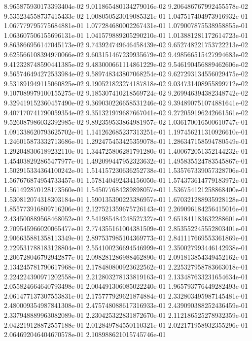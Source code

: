 8.965875930173393404e-02
9.011865480134279016e-02
9.206486767992455578e-02
9.535234558737415433e-02
1.008050523019085321e-01
1.047517404973916932e-01
1.067779795775684881e-01
1.077284680002267431e-01
1.079007875538958855e-01
1.063607506155696131e-01
1.041579889205290210e-01
1.013881281172614723e-01
9.863866956147045173e-02
9.743924749646458439e-02
9.652748221753722213e-02
9.625566108394970066e-02
9.603151467239935679e-02
9.498566515427994683e-02
9.412328748590441385e-02
9.483000661114861229e-02
9.546190456889462606e-02
9.565746494272533984e-02
9.589748343807068254e-02
9.627293134556029475e-02
9.531891949115060825e-02
9.190521823274187818e-02
9.034731408955899712e-02
9.107089979100155275e-02
9.185307410218569724e-02
9.269946394382348742e-02
9.329419152360457490e-02
9.369030226658531246e-02
9.394890751074881641e-02
9.407170741790059354e-02
9.351321979687667041e-02
9.272059196242661561e-02
9.526087986032392985e-02
9.892359533864981957e-02
1.036170016500610747e-01
1.091338620793625702e-01
1.141262685237313251e-01
1.197456211310926610e-01
1.246015873332713686e-01
1.292475453425359078e-01
1.286347158594780549e-01
1.292048306189232110e-01
1.344725806281791280e-01
1.400672051352144232e-01
1.454038292865477977e-01
1.492099447952323632e-01
1.495835524783545867e-01
1.502915334364100242e-01
1.514157230636252738e-01
1.535767339057328706e-01
1.567676874954733457e-01
1.578140492434156050e-01
1.574373614779183972e-01
1.561492870128173560e-01
1.545077684289898057e-01
1.536754121258868400e-01
1.530812074318303184e-01
1.590135390223386957e-01
1.670321288935928128e-01
1.855773916809716206e-01
2.127521359675726143e-01
2.269096184256415016e-01
2.434500889568468052e-01
2.541985484248527327e-01
2.651841183632288601e-01
2.709545966020065477e-01
2.774355161004381509e-01
2.853552245552803401e-01
2.906635881358113349e-01
2.897537985104369773e-01
2.841117669553361869e-01
2.729531788183128804e-01
2.554100236694546999e-01
2.350027993446142938e-01
2.206728046792942877e-01
2.098281286988462890e-01
2.091813854349452162e-01
2.134245781790617968e-01
2.178480800923622562e-01
2.225327958783663018e-01
2.224224390971202558e-01
2.212803278133819163e-01
2.133487633231654634e-01
2.055824664640793498e-01
2.004491306085022240e-01
1.965793776449282493e-01
2.061477137307553831e-01
2.175777929621874884e-01
2.332803495987145481e-01
2.480009354987841308e-01
2.475748088617316933e-01
2.439090388252436459e-01
2.337948889963082089e-01
2.230425322831872670e-01
2.112186525278932359e-01
2.042219128872557188e-01
2.012849784550110321e-01
2.022171958932355296e-01
2.064692046404670578e-01
2.108988621015745746e-01
